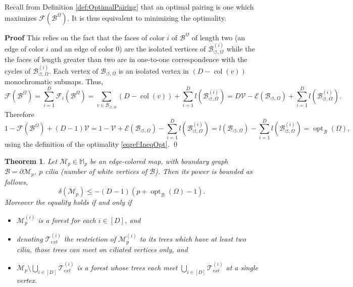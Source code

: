 \documentclass[aps,prd,10pt,notitlepage,nofootinbib,superscriptaddress,showkeys,showpacs]{revtex4-1}
\newtheorem{theorem}{Theorem}
\begin{document}
Recall from Definition \ref{def:OptimalPairing} that an optimal pairing is one which maximizes ${\mathcal{F}}({\mathcal{B}}^\Omega)$. It is thus equivalent to minimizing the optimality.

{{\noindent \bf Proof\; \; }} This relies on the fact that the faces of color $i$ of ${\mathcal{B}}^\Omega$ of length two (an edge of color $i$ and an edge of color 0) are the isolated vertices of ${\mathcal{B}}_{\circlearrowleft,\Omega}^{(i)}$ while the the faces of length greater than two are in one-to-one correspondence with the cycles of ${\mathcal{B}}_{\circlearrowleft,\Omega}^{(i)}$. Each vertex of ${\mathcal{B}}_{\circlearrowleft,\Omega}$ is an isolated vertex in $(D - \operatorname{col}(v))$ monochromatic submaps. Thus,
\begin{equation}
{\mathcal{F}}({\mathcal{B}}^\Omega) = \sum_{i=1}^D {\mathcal{F}}_{i}({\mathcal{B}}^\Omega) = \sum_{v\in{\mathcal{B}}_{\circlearrowleft,\Omega}}(D-\operatorname{col}(v)) + \sum_{i=1}^D l({\mathcal{B}}_{\circlearrowleft,\Omega}^{(i)}) = D{\mathcal{V}} - {\mathcal{E}}({\mathcal{B}}_{\circlearrowleft,\Omega}) + \sum_{i=1}^D l({\mathcal{B}}_{\circlearrowleft,\Omega}^{(i)}).
\end{equation} 
Therefore
\begin{equation}
1 - {\mathcal{F}}({\mathcal{B}}^\Omega) + (D-1){\mathcal{V}} = 1 - {\mathcal{V}} + {\mathcal{E}}({\mathcal{B}}_{\circlearrowleft,\Omega}) - \sum_{i=1}^D l({\mathcal{B}}_{\circlearrowleft,\Omega}^{(i)}) = l({\mathcal{B}}_{\circlearrowleft,\Omega}) - \sum_{i=1}^D l({\mathcal{B}}_{\circlearrowleft,\Omega}^{(i)}) = \operatorname{opt}_{\mathcal{B}}(\Omega),
\end{equation}
using the definition of the optimality \eqref{eqref:IneqOpt}.
\qed

\begin{theorem}
Let ${\mathcal{M}}_p\in {\mathbb{M}}_p$ be an edge-colored map, with boundary graph ${\mathcal{B}} = \partial {\mathcal{M}}_p$, $p$ cilia (number of white vertices of ${\mathcal{B}}$). Then its power is bounded as follows,
\begin{equation}
\label{PowDomB}
\delta({\mathcal{M}}_p)\leq -(D-1)(p+\operatorname{opt}_{\mathcal{B}}(\Omega)-1).
\end{equation}
Moreover the equality holds if and only if 
\begin{itemize}
\item ${\mathcal{M}}_p^{(i)}$ is a forest for each $i\in[D]$, and
\item denoting ${\mathcal{T}}_{ext}^{(i)}$ the restriction of ${\mathcal{M}}_p^{(i)}$ to its trees which have at least two cilia, those trees can meet on ciliated vertices only, and
\item ${\mathcal{M}}_p\setminus \bigcup_{i\in[D]} {\mathcal{T}}_{ext}^{(i)}$ is a forest whose trees each meet $\bigcup_{i\in[D]} {\mathcal{T}}_{ext}^{(i)}$ at a single vertex.
\end{itemize}
\end{theorem}
\end{document}
